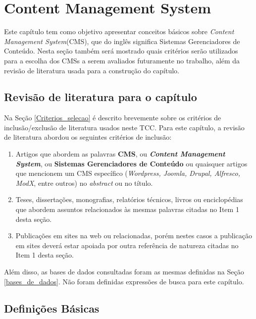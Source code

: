 \chapter[CMS]{Content Management System}
\label{CMS}

Este capítulo tem como objetivo apresentar conceitos básicos sobre \textit{Content Management System}(CMS), que do inglês significa Sistemas Gerenciadores de Conteúdo. Nesta seção também será mostrado quais critérios serão utilizados para a escolha dos CMSs a serem avaliados futuramente no trabalho, além da revisão de literatura usada para a construção do capítulo.

\section {Revisão de literatura para o capítulo}

Na Seção \ref{Criterios_selecao} é descrito brevemente sobre os critérios de inclusão/exclusão de literatura usados neste TCC. Para este capítulo, a revisão de literatura abordou os seguintes critérios de inclusão: 

\begin{enumerate}

\item Artigos que abordem as palavras \textbf{CMS}, ou \textbf{\textit{Content Management System}}, ou \textbf{Sistemas Gerenciadores de Conteúdo}  ou quaisquer artigos que mencionem um CMS específico (\textit{Wordpress, Joomla, Drupal, Alfresco, ModX}, entre outros) no \textit{abstract} ou no título.

\item Teses, dissertações, monografias, relatórios técnicos, livros ou enciclopédias que abordem assuntos relacionados às mesmas palavras citadas no Item 1 desta seção.

\item Publicações em sites na web ou relacionadas,  porém nestes casos a publicação em sites deverá estar apoiada por outra referência de natureza citadas no Item 1 desta seção.

\end{enumerate}

Além disso, as bases de dados consultadas foram as mesmas definidas na Seção \ref{bases_de_dados}. Não foram definidas expressões de busca para este capítulo.

\section{Definições Básicas}


